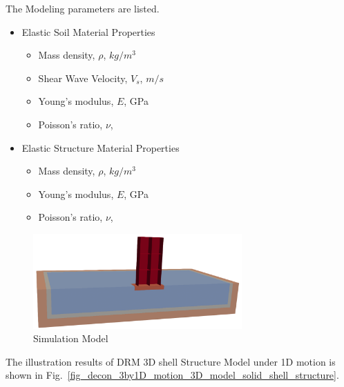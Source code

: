 The Modeling parameters are listed.
\begin{itemize}
  \item Elastic Soil Material Properties 
  \begin{itemize}
    \item Mass density, $\rho$, \enspace {} $kg/m^3$
    \item Shear Wave Velocity, $V_s$, \enspace {} $m/s$
    \item Young's modulus, $E$, \enspace {} GPa
    \item Poisson's ratio, $\nu$, \enspace {}
  \end{itemize}
  \item Elastic Structure Material Properties 
  \begin{itemize}
    \item Mass density, $\rho$, \enspace {} $kg/m^3$
    \item Young's modulus, $E$, \enspace {} GPa
    \item Poisson's ratio, $\nu$, \enspace {}
  \end{itemize}
\end{itemize}

\begin{figure}[H]
  \centering
  \includegraphics[width = 8cm]{./Figure-files/Day2/Deconvolution_3by1D_Motions/Shell_Structure_Soil_Interaction_3D_DRM/overview.png}
  \caption{Simulation Model}
  \label{fig_decon_3by1D_motion_3D_model_shell}
\end{figure}


The illustration results of DRM 3D shell Structure Model under 1D motion is shown 
in Fig.~\ref{fig_decon_3by1D_motion_3D_model_solid_shell_structure}. 

